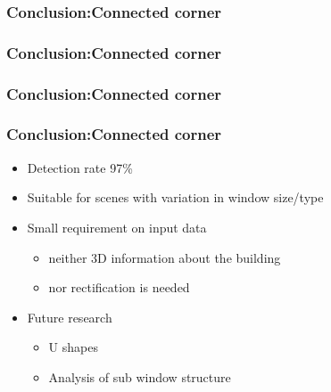 \documentclass{beamer}
\begin{document}
\frame
{
}

\frame
{
	\frametitle{Conclusion:Connected corner}
}

\frame
{
	\frametitle{Conclusion:Connected corner}
}

\frame
{
	\frametitle{Conclusion:Connected corner}
}


\frame
{
	\frametitle{Conclusion:Connected corner}
	\begin{itemize}
	\item <+-| alert@+> Detection rate 97\%
	\item <+-| alert@+> Suitable for scenes with variation in window size/type
	\item <+-| alert@+> Small requirement on input data
		\begin{itemize}
		\item <+-| alert@+> neither 3D information about the building 
		\item <+-| alert@+> nor rectification is needed
		\end{itemize}
	\item <+-| alert@+> Future research
		\begin{itemize}			
		\item <+-| alert@+> U shapes 
		\item <+-| alert@+> Analysis of sub window structure
		\end{itemize}			
	\end{itemize}
}
\end{document}
